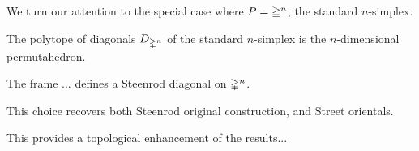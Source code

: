 We turn our attention to the special case where $P = \mathbb{\Delta}^n$, the standard $n$-simplex.

\begin{lemma}
	The polytope of diagonals $D_{\mathbb{\Delta}^n}$ of the standard $n$-simplex is the $n$-dimensional permutahedron.
\end{lemma}

\begin{lemma}
	The frame ... defines a Steenrod diagonal on $\mathbb{\Delta}^n$.
\end{lemma}

\begin{theorem}
	This choice recovers both Steenrod original construction, and Street orientals.
\end{theorem}

This provides a topological enhancement of the results...




